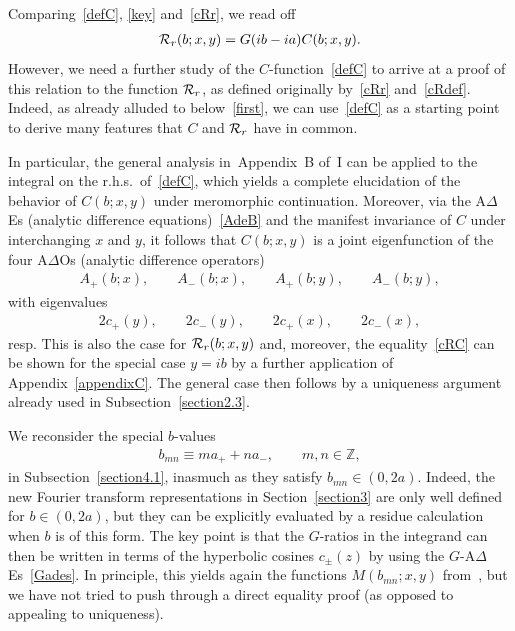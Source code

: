 \documentclass[11pt]{article}
\numberwithin{equation}{section}
\newcommand{\De}{\Delta}
\newcommand{\Z}{{\mathbb Z}}
\newcommand{\cR}{{\cal R}}
\begin{document}
Comparing~\eqref{defC}, \eqref{key} and~\eqref{cRr}, we read of\/f
\begin{gather}\label{cRC}
\cR_r(b;x,y)=G(ib-ia)C(b;x,y).
\end{gather}
However, we need a further study of the $C$-function~\eqref{defC} to arrive at a proof of this relation to the function $\cR_r$, as def\/ined originally by~\eqref{cRr} and~\eqref{cRdef}. Indeed, as already alluded to below~\eqref{first}, we can use~\eqref{defC} as a starting point to derive many features that $C$ and $\cR_r$ have in common.

In particular, the general analysis in~Appendix~B of~I can be applied to the integral on the r.h.s.\ of~\eqref{defC}, which yields a complete elucidation of the behavior of $C(b;x,y)$ under meromorphic continuation.
Moreover, via the A$\De$Es (analytic dif\/ference equations)~\eqref{AdeB} and the manifest invariance of $C$ under interchanging $x$ and $y$, it follows that
$C(b;x,y)$ is a joint eigenfunction of the four A$\De$Os (analytic dif\/ference operators)
\begin{gather}\label{4A}
A_{+}(b;x),\qquad A_{-}(b;x),\qquad A_{+}(b;y),\qquad
A_{-}(b;y),
\end{gather}
with eigenvalues
\begin{gather}\label{4ev}
2c_{+}(y),\qquad 2c_{-}(y),\qquad
2c_{+}(x),\qquad 2c_{-}(x),
\end{gather}
resp. This is also the case for $\cR_r(b;x,y)$ and, moreover, the equality~\eqref{cRC} can be shown for the special case $y=ib$ by a further application of Appendix~\ref{appendixC}. The general case then follows by a uniqueness argument already used in Subsection~\ref{section2.3}.

We reconsider the special $b$-values
\begin{gather}\label{bmn}
b_{mn}\equiv ma_{+}+na_{-},\qquad m,n\in\Z,
\end{gather}
in Subsection~\ref{section4.1}, inasmuch as they satisfy $b_{mn}\in(0,2a)$.  Indeed, the new Fourier transform representations in Section~\ref{section3} are only well def\/ined for $b\in(0,2a)$, but they can be explicitly evaluated by a residue calculation when $b$ is of this form. The key point is that the $G$-ratios in the integrand can then be written in terms of the hyperbolic cosines $c_{\pm}(z)$ by using the $G$-A$\De$Es~\eqref{Gades}. In principle, this yields again the functions $M(b_{mn};x,y)$ from~\cite{GLFII}, but we have not tried to push through a direct equality proof (as opposed to appealing to uniqueness).
\setcounter{section}{1}
\setcounter{subsection}{0}
\setcounter{subsubsection}{0}
\setcounter{equation}{19}
\end{document}
